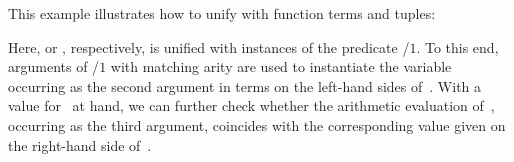 \begin{example}\label{ex:unify}
This example illustrates how to unify with function terms and tuples:
%

%
Here,  or
, respectively,
is unified with instances of the predicate /$1$.
To this end,
arguments of /$1$ with matching arity
are used to instantiate the variable~ occurring
as the second argument in terms on the left-hand sides of~\code{=}.
With a value for~ at hand,
we can further check whether the arithmetic evaluation of~,
occurring as the third argument, coincides with the 
corresponding value given on the right-hand side of~\code{=}.
%
\eexample
\end{example}

